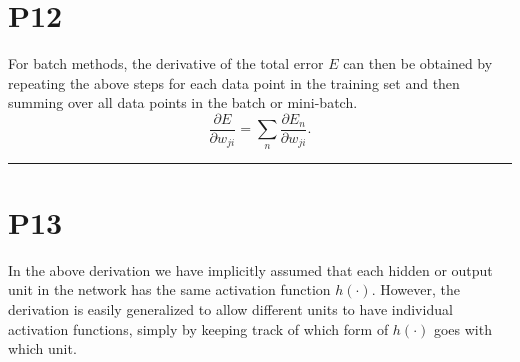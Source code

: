 \documentclass{article}
\begin{document}
\section{P12}

For batch methods, the derivative of the total error $E$ can then be obtained by repeating the above steps for each data point in the training set and then summing over all data points in the batch or mini-batch.
\begin{equation}
    \frac{\partial E}{\partial w_{ji}} = \sum_n \frac{\partial E_n}{\partial w_{ji}}.
    \tag{8.14}
\end{equation}

\noindent\rule{\linewidth}{0.4pt}

\section{P13}

In the above derivation we have implicitly assumed that each hidden or output unit in the network has the same activation function $h(\cdot)$. However, the derivation is easily generalized to allow different units to have individual activation functions, simply by keeping track of which form of $h(\cdot)$ goes with which unit.
\end{document}
